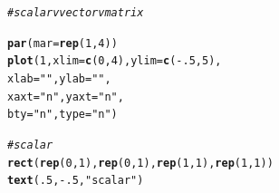 \documentclass{tufte-book}\usepackage[]{graphicx}\usepackage[]{color}
\makeatletter
\newcommand{\hlnum}[1]{\textcolor[rgb]{0.686,0.059,0.569}{#1}}%
\newcommand{\hlstr}[1]{\textcolor[rgb]{0.192,0.494,0.8}{#1}}%
\newcommand{\hlcom}[1]{\textcolor[rgb]{0.678,0.584,0.686}{\textit{#1}}}%
\newcommand{\hlopt}[1]{\textcolor[rgb]{0,0,0}{#1}}%
\newcommand{\hlstd}[1]{\textcolor[rgb]{0.345,0.345,0.345}{#1}}%
\newcommand{\hlkwc}[1]{\textcolor[rgb]{0.333,0.667,0.333}{#1}}%
\newcommand{\hlkwd}[1]{\textcolor[rgb]{0.737,0.353,0.396}{\textbf{#1}}}%
\newenvironment{kframe}{%
 \def\at@end@of@kframe{}%
 \ifinner\ifhmode%
  \def\at@end@of@kframe{\end{minipage}}%
  \begin{minipage}{\columnwidth}%
 \fi\fi%
 \def\FrameCommand##1{\hskip\@totalleftmargin \hskip-\fboxsep
 \colorbox{shadecolor}{##1}\hskip-\fboxsep
     \hskip-\linewidth \hskip-\@totalleftmargin \hskip\columnwidth}%
 \MakeFramed {\advance\hsize-\width
   \@totalleftmargin\z@ \linewidth\hsize
   \@setminipage}}%
 {\par\unskip\endMakeFramed%
 \at@end@of@kframe}
\newenvironment{knitrout}{}{} %
\makeatother
\begin{document}
\begin{marginfigure}
\begin{tiny}
\begin{knitrout}
\color{fgcolor}\begin{kframe}
\begin{alltt}
\hlcom{# scalar v vector v matrix  }

\hlkwd{par}\hlstd{(}\hlkwc{mar} \hlstd{=} \hlkwd{rep}\hlstd{(}\hlnum{1}\hlstd{,} \hlnum{4}\hlstd{))}
\hlkwd{plot}\hlstd{(}\hlnum{1}\hlstd{,} \hlkwc{xlim} \hlstd{=} \hlkwd{c}\hlstd{(}\hlnum{0}\hlstd{,} \hlnum{4}\hlstd{),} \hlkwc{ylim} \hlstd{=} \hlkwd{c}\hlstd{(}\hlopt{-}\hlnum{.5}\hlstd{,} \hlnum{5}\hlstd{),}
     \hlkwc{xlab} \hlstd{=} \hlstr{""}\hlstd{,} \hlkwc{ylab} \hlstd{=} \hlstr{""}\hlstd{,}
     \hlkwc{xaxt} \hlstd{=} \hlstr{"n"}\hlstd{,} \hlkwc{yaxt} \hlstd{=} \hlstr{"n"}\hlstd{,}
     \hlkwc{bty} \hlstd{=} \hlstr{"n"}\hlstd{,} \hlkwc{type} \hlstd{=} \hlstr{"n"}\hlstd{)}

\hlcom{# scalar}
\hlkwd{rect}\hlstd{(}\hlkwd{rep}\hlstd{(}\hlnum{0}\hlstd{,} \hlnum{1}\hlstd{),} \hlkwd{rep}\hlstd{(}\hlnum{0}\hlstd{,} \hlnum{1}\hlstd{),} \hlkwd{rep}\hlstd{(}\hlnum{1}\hlstd{,} \hlnum{1}\hlstd{),} \hlkwd{rep}\hlstd{(}\hlnum{1}\hlstd{,} \hlnum{1}\hlstd{))}
\hlkwd{text}\hlstd{(}\hlnum{.5}\hlstd{,} \hlopt{-}\hlnum{.5}\hlstd{,} \hlstr{"scalar"}\hlstd{)}


\end{alltt}
\end{kframe}
\end{knitrout}
\end{tiny}
\end{marginfigure}
\end{document}
